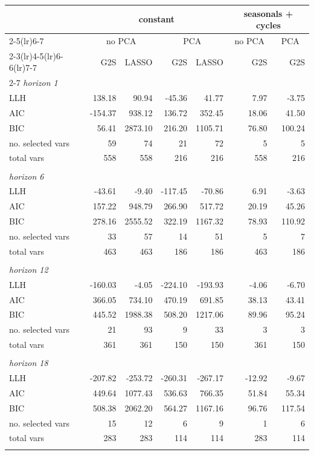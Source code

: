 \begin{table}[t!]
\centering
\small
\begin{tabularx}{1.00\textwidth}{@{\extracolsep{\stretch{1}}}lrrrrrr@{}}
\toprule
& \multicolumn{4}{c}{constant}& \multicolumn{2}{c}{seasonals + cycles} \\
\cmidrule(lr){2-5}\cmidrule(lr){6-7}
& \multicolumn{2}{c}{no PCA}& \multicolumn{2}{c}{PCA}& \multicolumn{1}{c}{no PCA}& \multicolumn{1}{c}{PCA} \\
\cmidrule(lr){2-3}\cmidrule(lr){4-5}\cmidrule(lr){6-6}\cmidrule(lr){7-7}
& G2S & LASSO & G2S & LASSO & G2S & G2S \\
\cmidrule{2-7}
\textit{horizon 1} & & & & & & \\
LLH & 138.18 & 90.94 & -45.36 & 41.77 & 7.97 & -3.75 \\
AIC & -154.37 & 938.12 & 136.72 & 352.45 & 18.06 & 41.50 \\
BIC & 56.41 & 2873.10 & 216.20 & 1105.71 & 76.80 & 100.24 \\
no. selected vars & 59 & 74 & 21 & 72 & 5 & 5 \\
total vars & 558 & 558 & 216 & 216 & 558 & 216 \\
 & & & & & & \\
\textit{horizon 6} & & & & & & \\
LLH & -43.61 & -9.40 & -117.45 & -70.86 & 6.91 & -3.63 \\
AIC & 157.22 & 948.79 & 266.90 & 517.72 & 20.19 & 45.26 \\
BIC & 278.16 & 2555.52 & 322.19 & 1167.32 & 78.93 & 110.92 \\
no. selected vars & 33 & 57 & 14 & 51 & 5 & 7 \\
total vars & 463 & 463 & 186 & 186 & 463 & 186 \\
 & & & & & & \\
\textit{horizon 12} & & & & & & \\
LLH & -160.03 & -4.05 & -224.10 & -193.93 & -4.06 & -6.70 \\
AIC & 366.05 & 734.10 & 470.19 & 691.85 & 38.13 & 43.41 \\
BIC & 445.52 & 1988.38 & 508.20 & 1217.06 & 89.96 & 95.24 \\
no. selected vars & 21 & 93 & 9 & 33 & 3 & 3 \\
total vars & 361 & 361 & 150 & 150 & 361 & 150 \\
 & & & & & & \\
\textit{horizon 18} & & & & & & \\
LLH & -207.82 & -253.72 & -260.31 & -267.17 & -12.92 & -9.67 \\
AIC & 449.64 & 1077.43 & 536.63 & 766.35 & 51.84 & 55.34 \\
BIC & 508.38 & 2062.20 & 564.27 & 1167.16 & 96.76 & 117.54 \\
no. selected vars & 15 & 12 & 6 & 9 & 1 & 6 \\
total vars & 283 & 283 & 114 & 114 & 283 & 114 \\
 & & & & & & \\
\bottomrule
\end{tabularx}
\end{table}
